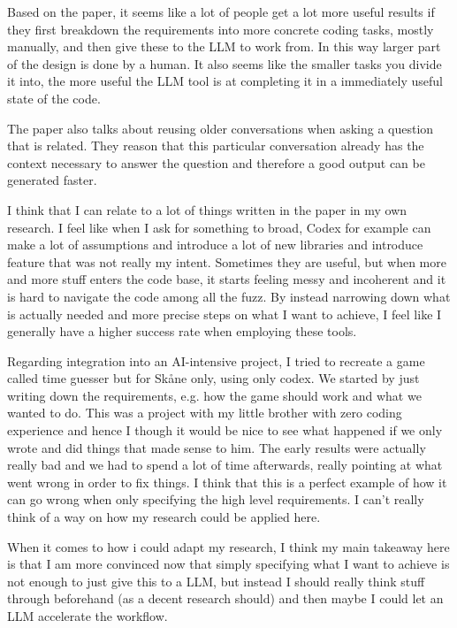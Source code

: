 \documentclass[11pt]{article}
\begin{document}
Based on the paper, it seems like a lot of people get a lot more useful results if they first breakdown the requirements into more concrete coding tasks, mostly manually, and then give these to the LLM to work from. In this way larger part of the design is done by a human. It also seems like the smaller tasks you divide it into, the more useful the LLM tool is at completing it in a immediately useful state of the code. 

The paper also talks about reusing older conversations when asking a question that is related. They reason that this particular conversation already has the context necessary to answer the question and therefore a good output can be generated faster. 

I think that I can relate to a lot of things written in the paper in my own research. I feel like when I ask for something to broad, Codex for example can make a lot of assumptions and introduce a lot of new libraries and introduce feature that was not really my intent. Sometimes they are useful, but when more and more stuff enters the code base, it starts feeling messy and incoherent and it is hard to navigate the code among all the fuzz. By instead narrowing down what is actually needed and more precise steps on what I want to achieve, I feel like I generally have a higher success rate when employing these tools.

Regarding integration into an AI-intensive project, I tried to recreate a game called time guesser but for Skåne only, using only codex. We started by just writing down the requirements, e.g. how the game should work and what we wanted to do. This was a project with my little brother with zero coding experience and hence I though it would be nice to see what happened if we only wrote and did things that made sense to him. The early results were actually really bad and we had to spend a lot of time afterwards, really pointing at what went wrong in order to fix things. I think that this is a perfect example of how it can go wrong when only specifying the high level requirements. I can't really think of a way on how my research could be applied here.

When it comes to how i could adapt my research, I think my main takeaway here is that I am more convinced now that simply specifying what I want to achieve is not enough to just give this to a LLM, but instead I should really think stuff through beforehand (as a decent research should) and then maybe I could let an LLM accelerate the workflow. 
\end{document}

